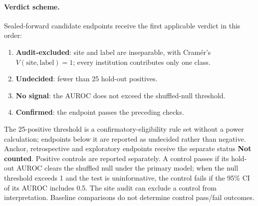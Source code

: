 \documentclass[a4paper,10pt,twocolumn]{extarticle}
\begin{document}
\paragraph{Verdict scheme.} Sealed-forward candidate endpoints receive the first applicable verdict in this order:
\begin{enumerate}
\setlength{\itemsep}{0pt}
\item \textbf{Audit-excluded}: site and label are inseparable, with Cram\'er's $V(\mathrm{site},\mathrm{label})=1$; every institution contributes only one class.
\item \textbf{Undecided}: fewer than 25 hold-out positives.
\item \textbf{No signal}: the AUROC does not exceed the shuffled-null threshold.
\item \textbf{Confirmed}: the endpoint passes the preceding checks.
\end{enumerate}
The 25-positive threshold is a confirmatory-eligibility rule set without a power calculation; endpoints below it are reported as undecided rather than negative. Anchor, retrospective and exploratory endpoints receive the separate status \textbf{Not counted}. Positive controls are reported separately. A control passes if its hold-out AUROC clears the shuffled null under the primary model; when the null threshold exceeds 1 and the test is uninformative, the control fails if the 95\% CI of its AUROC includes 0.5. The site audit can exclude a control from interpretation. Baseline comparisons do not determine control pass/fail outcomes.
\end{document}

